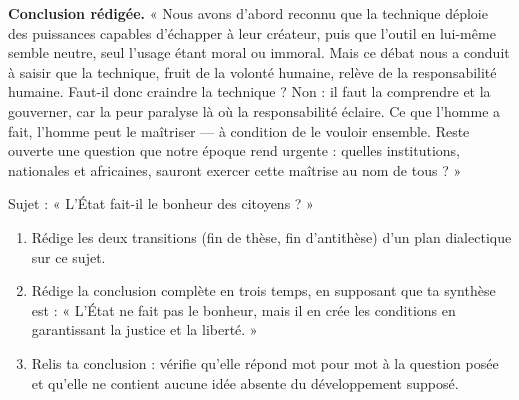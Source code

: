 \documentclass[11pt]{article}
\begin{document}
\begin{exoresolu}
\par\smallskip
\textbf{Conclusion rédigée.} « Nous avons d'abord reconnu que la technique déploie des puissances capables d'échapper à leur créateur, puis que l'outil en lui-même semble neutre, seul l'usage étant moral ou immoral. Mais ce débat nous a conduit à saisir que la technique, fruit de la volonté humaine, relève de la responsabilité humaine. Faut-il donc craindre la technique ? Non : il faut la comprendre et la gouverner, car la peur paralyse là où la responsabilité éclaire. Ce que l'homme a fait, l'homme peut le maîtriser — à condition de le vouloir ensemble. Reste ouverte une question que notre époque rend urgente : quelles institutions, nationales et africaines, sauront exercer cette maîtrise au nom de tous ? »
\end{exoresolu}

\begin{exercice}
Sujet : « L'État fait-il le bonheur des citoyens ? »
\begin{enumerate}
\item Rédige les deux transitions (fin de thèse, fin d'antithèse) d'un plan dialectique sur ce sujet.
\item Rédige la conclusion complète en trois temps, en supposant que ta synthèse est : « L'État ne fait pas le bonheur, mais il en crée les conditions en garantissant la justice et la liberté. »
\item Relis ta conclusion : vérifie qu'elle répond mot pour mot à la question posée et qu'elle ne contient aucune idée absente du développement supposé.
\end{enumerate}
\end{exercice}
\end{document}
